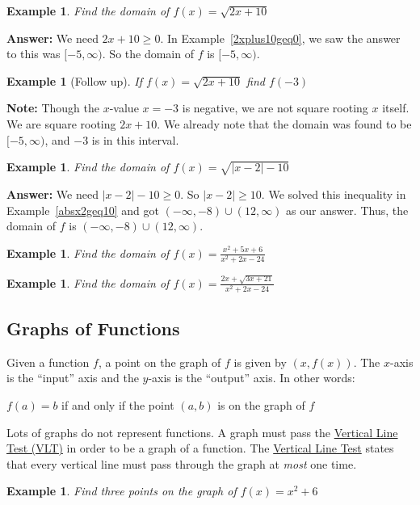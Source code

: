 \documentclass[twoside]{tufte-handout}
\newcounter{ekcounter}%
\theoremstyle{ekimcustom}
\newtheorem{exm}[ekcounter]{Example}
\begin{document}
\begin{exm}
Find the domain of $f(x) = \sqrt{2x+10}$
\end{exm}
{\bf Answer:} We need $2x+10 \geq 0$. In Example~\ref{2xplus10geq0}, we saw the answer to this was $[-5,\infty)$. So the domain of $f$ is $[-5,\infty)$.

\begin{exm}[Follow up]
If $f(x) = \sqrt{2x+10}$ find $f(-3)$
\end{exm}
{\bf Note:} Though the $x$-value $x=-3$ is negative, we are not square rooting $x$ itself. We are square rooting $2x+10$. We already note that the domain was found to be $[-5,\infty)$, and $-3$ is in this interval.
\vskip50pt

\begin{exm}
Find the domain of $f(x) = \sqrt{|x-2| - 10}$
\end{exm}
{\bf Answer:} We need $|x-2|-10 \geq 0$. So $|x-2| \geq 10$. We solved this inequality in Example~\ref{absx2geq10} and got $(-\infty,-8) \cup (12,\infty)$ as our answer. Thus, the domain of $f$ is $(-\infty,-8) \cup (12,\infty)$.

\begin{exm}
Find the domain of $f(x) = \frac{x^2+5x+6}{x^2+2x-24}$
\end{exm}


\begin{exm}
Find the domain of $f(x) = \frac{2x + \sqrt{3x+21}}{x^2+2x-24}$
\end{exm}


\subsection{Graphs of Functions}
Given a function $f$, a point on the graph of $f$ is given by $(x,f(x))$. The $x$-axis is the ``input'' axis and the $y$-axis is the ``output'' axis. In other words:
\begin{bconcept}{}{}
$f(a)=b$ if and only if the point $(a,b)$ is on the graph of $f$
\end{bconcept}

Lots of graphs do not represent functions. A graph must pass the \underline{Vertical Line Test (VLT)} in order to be a graph of a function. The  \underline{Vertical Line Test} states that every vertical line must pass through the graph at {\it most} one time.

\begin{exm}
Find three points on the graph of $f(x) = x^2+6$
\end{exm}
\end{document}
